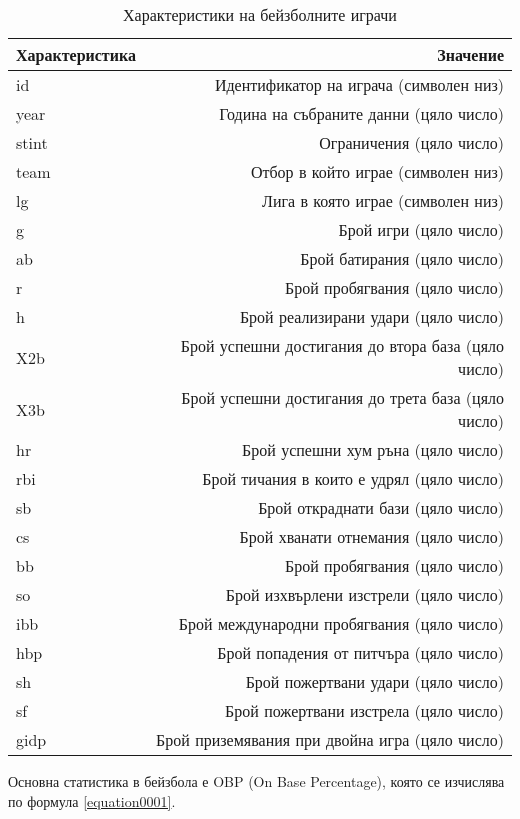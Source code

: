 \begin{table}[h!]
\centering
\begin{tabular}{|l|r|} 
  \rowcolor{lightgray}
  \hline
  Характеристика & Значение \\ [0.1ex] 
  \hline\hline
  id & Идентификатор на играча (символен низ) \\
  \hline
  year & Година на събраните данни (цяло число) \\
  \hline
  stint & Ограничения (цяло число) \\
  \hline
  team & Отбор в който играе (символен низ) \\
  \hline
  lg & Лига в която играе (символен низ) \\
  \hline
  g & Брой игри (цяло число) \\
  \hline
  ab & Брой батирания (цяло число) \\
  \hline
  r & Брой пробягвания (цяло число) \\
  \hline
  h & Брой реализирани удари (цяло число) \\
  \hline
  X2b & Брой успешни достигания до втора база (цяло число) \\
  \hline
  X3b & Брой успешни достигания до трета база (цяло число) \\
  \hline
  hr & Брой успешни хум ръна (цяло число) \\
  \hline
  rbi & Брой тичания в които е удрял (цяло число) \\
  \hline
  sb & Брой откраднати бази (цяло число) \\
  \hline
  cs & Брой хванати отнемания (цяло число) \\
  \hline
  bb & Брой пробягвания (цяло число) \\
  \hline
  so & Брой изхвърлени изстрели (цяло число) \\
  \hline
  ibb & Брой международни пробягвания (цяло число) \\
  \hline
  hbp & Брой попадения от питчъра (цяло число) \\
  \hline
  sh & Брой пожертвани удари (цяло число) \\
  \hline
  sf & Брой пожертвани изстрела (цяло число) \\
  \hline
  gidp & Брой приземявания при двойна игра (цяло число) \\
  \hline
\end{tabular}
\caption{Характеристики на бейзболните играчи}
\label{table0003}
\end{table}

Основна статистика в бейзбола е OBP (On Base Percentage), която се изчислява по формула \ref{equation0001}.

